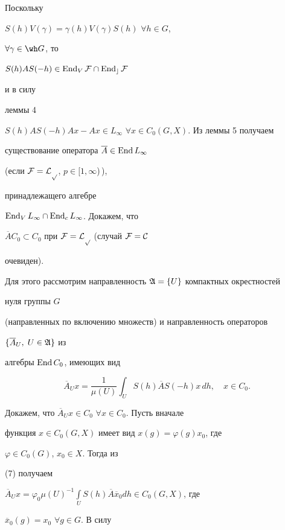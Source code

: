 \begin{pf} Поскольку 


$S(h)V(\gamma)=\gamma(h)V(\gamma)S(h)$ $\forall h\in G$, 


$\forall\gamma\in\wh G$, то 


$S(h)AS(-h)\in\operatorname{End}_V\cal F\cap\operatorname{End}_c\cal F$ 


и в силу 


леммы 4 


$S(h)AS(-h)Ax-Ax\in L_\infty$ $\forall x\in C_0(G,X)$. Из леммы 5 получаем 


существование оператора $\overline A\in\operatorname{End} L_\infty$ 


(если $\cal F=L_p$, $p\in[1,\infty$)\,), 


принадлежащего алгебре 


$\operatorname{End}_V L_\infty\cap\operatorname{End}_c L_\infty$. Докажем, что 


$\overline AC_0\subset C_0$ при $\cal F=L_p$ (случай $\cal F=C$ 


очевиден). 


 


Для этого рассмотрим направленность $\frak A=\{U\}$ компактных окрестностей 


нуля группы $G$ 


(направленных по включению множеств) и направленность операторов 


$\{\overline A_U,\;U\in\frak A\}$ из 


алгебры $\operatorname{End} C_0$, имеющих вид 


\begin{equation} 


\overline A_U x=\frac{1}{\mu(U)}\int_U S(h)\overline AS(-h)x\,dh, 


\quad x\in C_0. 


\end{equation} 


Докажем, что $\overline A_Ux\in C_0$ $\forall x\in C_0$. Пусть вначале 


функция $x\in C_0(G,X)$ имеет вид $x(g)=\varphi(g)x_0$, где 


$\varphi\in C_0(G)$, $x_0\in X$. Тогда из 


(7) получаем 


$\overline A_Ux=\varphi_0\mu(U)^{-1}\int\limits_US(h) 


\overline A\overline x_0dh\in C_0(G,X)$, где 


$\overline x_0(g)=x_0$ $\forall g\in G$. В силу 



\end{pf}
